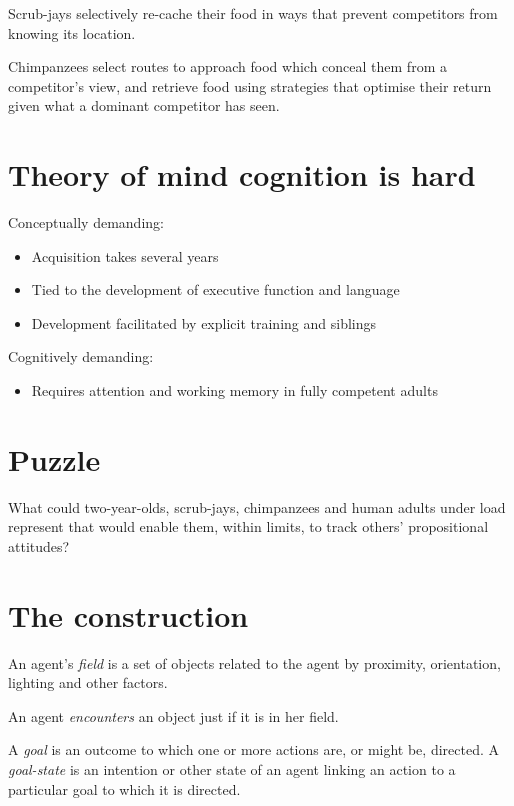 \documentclass[11pt]{extarticle}
\begin{document}
\begin{multicols}{3}
Scrub-jays selectively re-cache their food in ways that prevent competitors from knowing its location.\citep{Clayton:2007fh}

Chimpanzees select routes to approach food which conceal them from a competitor’s view,\citep{Hare:2006ih} and retrieve food using strategies that optimise their return given what a dominant competitor has seen.\citep{Hare:2001ph}



\section{Theory of mind cognition is hard}
Conceptually demanding:
\begin{itemize}\itemsep0pt
\item Acquisition takes several years\citep{Wimmer:1983dz,Wellman:2001lz}
\item Tied to the development of executive function\citep{Perner:1999yr,Sabbagh:2006ke} and language\citep{Astington2005ot}
\item Development facilitated by explicit training\citep{Slaughter:1996fv} and siblings\citep{Clements:2000nc,Hughes:2004zj}
\end{itemize}
%
Cognitively demanding: 
\begin{itemize}
\item Requires attention and working memory in fully competent adults\citep{Apperly:2008jv,McKinnon:2007rr}
\end{itemize}



\section{Puzzle}
What could two-year-olds, scrub-jays, chimpanzees and human adults under load represent that would enable them, within limits, to track others’ propositional attitudes?


\section{The construction}
An agent’s \emph{field} is a set of objects related to the agent by proximity, orientation, lighting and other factors.

An agent \emph{encounters} an object just if it is in her field.

A \emph{goal} is an outcome to which one or more actions are, or might be, directed.  A \emph{goal-state} is an intention or other state of an agent linking an action to a particular goal to which it is directed.


\end{multicols}
\end{document}
